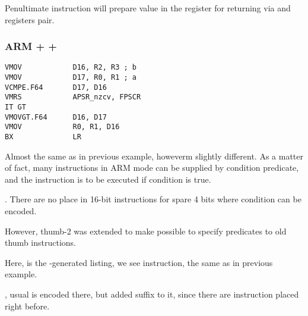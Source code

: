 {Penultimate instruction  will prepare value in the  register for returning via \Rzero and \Rone
registers pair.}

\subsubsection{ARM + \OptimizingXcode + \ThumbTwoMode}

\begin{lstlisting}[caption=\OptimizingXcode + \ThumbTwoMode]
VMOV            D16, R2, R3 ; b
VMOV            D17, R0, R1 ; a
VCMPE.F64       D17, D16
VMRS            APSR_nzcv, FPSCR
IT GT 
VMOVGT.F64      D16, D17
VMOV            R0, R1, D16
BX              LR
\end{lstlisting}

{Almost the same as in previous example, howeverm slightly different.}
{As a matter of fact, many instructions in ARM mode can be supplied by condition predicate,
and the instruction is to be executed if condition is true.}

. 
{There are no place in 16-bit instructions for spare 4 bits where condition can be encoded.}

{However, thumb-2 was extended to make possible to specify predicates to old thumb instructions.}

{Here, is the \IDA-generated listing, we see  instruction, the same as in previous example.}

, 
{usual  is encoded there}, 
{but \IDA added  suffix to it}, 
{since there are  instruction placed right before}.

